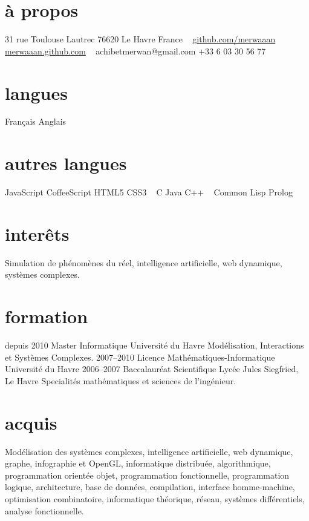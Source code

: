 \documentclass[]{friggeri-cv}
\begin{document}
       {}

\begin{aside}
  \section{à propos}
    31 rue Toulouse Lautrec
    76620 Le Havre
    France
    ~
    \href{http://github.com/merwaaan}{github.com/merwaaan}
    \href{http://merwaaan.github.com}{merwaaan.github.com}
    ~
    achibetmerwan{}@gmail.com
    +33 6 03 30 56 77
  \section{langues}
    Français
    Anglais
  \section{autres langues}
    JavaScript
    CoffeeScript
    HTML5
    CSS3
    ~
    C
    Java
    C++
    ~
    Common Lisp
    Prolog
\end{aside}

\section{interêts}

Simulation de phénomènes du réel, intelligence artificielle, web
dynamique, systèmes complexes.

\section{formation}

\begin{entrylist}
  \entry
    {depuis 2010}
    {Master Informatique}
    {Université du Havre}
    {Modélisation, Interactions et Systèmes Complexes.}
  \entry
    {2007–2010}
    {Licence Mathématiques-Informatique}
    {Université du Havre}
    {}
  \entry
    {2006–2007}
    {Baccalauréat Scientifique}
    {Lycée Jules Siegfried, Le Havre}
    {Specialités mathématiques et sciences de l'ingénieur.}
\end{entrylist}

\section{acquis}

Modélisation des systèmes complexes, intelligence artificielle, web
dynamique, graphe, infographie et OpenGL, informatique distribuée,
algorithmique, programmation orientée objet, programmation
fonctionnelle, programmation logique, architecture, base de données,
compilation, interface homme-machine, optimisation combinatoire,
informatique théorique, réseau, systèmes différentiels, analyse
fonctionnelle.
\end{document}
